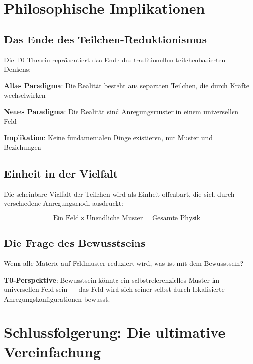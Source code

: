 \documentclass[12pt,a4paper]{article}
\begin{document}
	\section{Philosophische Implikationen}
	
	\subsection{Das Ende des Teilchen-Reduktionismus}
	
	Die T0-Theorie repräsentiert das Ende des traditionellen teilchenbasierten Denkens:
	
	\begin{tcolorbox}[colback=purple!5!white,colframe=purple!75!black,title=Paradigmenwechsel: Von Teilchen zu Mustern]
		\textbf{Altes Paradigma}: Die Realität besteht aus separaten Teilchen, die durch Kräfte wechselwirken
		
		\textbf{Neues Paradigma}: Die Realität sind Anregungsmuster in einem universellen Feld
		
		\textbf{Implikation}: Keine fundamentalen Dinge existieren, nur Muster und Beziehungen
	\end{tcolorbox}
	
	\subsection{Einheit in der Vielfalt}
	
	Die scheinbare Vielfalt der Teilchen wird als Einheit offenbart, die sich durch verschiedene Anregungsmodi ausdrückt:
	
	\begin{equation}
		\boxed{\text{Ein Feld} \times \text{Unendliche Muster} = \text{Gesamte Physik}}
		\label{eq:ultimate_unity}
	\end{equation}
	
	\subsection{Die Frage des Bewusstseins}
	
	Wenn alle Materie auf Feldmuster reduziert wird, was ist mit dem Bewusstsein?
	
	\textbf{T0-Perspektive}: Bewusstsein könnte ein selbstreferenzielles Muster im universellen Feld sein --- das Feld wird sich seiner selbst durch lokalisierte Anregungskonfigurationen bewusst.
	
	\section{Schlussfolgerung: Die ultimative Vereinfachung}
	
\end{document}
